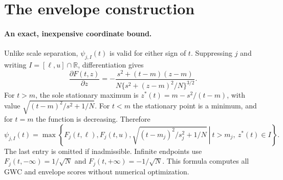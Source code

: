 \section{The envelope construction}
\paragraph{An exact, inexpensive coordinate bound.}
Unlike scale separation, $\psi_{j,I}(t)$ is valid for either sign of $t$.
Suppressing $j$ and writing $I=[\ell,u]\cap\mathbb R$, differentiation gives
\begin{equation}\label{mt:derivative}
 \frac{\partial F(t,z)}{\partial z}
 =-\frac{s^2+(t-m)(z-m)}{N\{s^2+(z-m)^2/N\}^{3/2}}.
\end{equation}
For $t>m$, the sole stationary maximum is
$z^*(t)=m-s^2/(t-m)$, with value
$\sqrt{(t-m)^2/s^2+1/N}$. For $t<m$ the stationary point is a minimum,
and for $t=m$ the function is decreasing. Therefore
\begin{equation}\label{mt:supremum}
 \psi_{j,I}(t)=\max\left\{
 F_j(t,\ell),F_j(t,u),
 \left.\sqrt{(t-m_j)^2/s_j^2+1/N}\ \right|\ t>m_j,\ z^*(t)\in I
 \right\}.
\end{equation}
The last entry is omitted if inadmissible. Infinite endpoints use
$F_j(t,-\infty)=1/\sqrt N$ and $F_j(t,+\infty)=-1/\sqrt N$.
This formula computes all GWC and envelope scores without numerical optimization.

